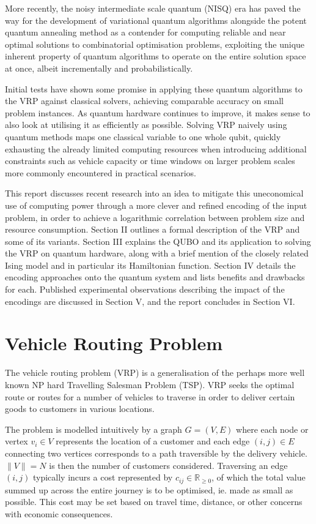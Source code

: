 \documentclass {article}
\begin{document}
More recently, the noisy intermediate scale quantum (NISQ) era has paved
the way for the development of variational quantum algorithms alongside the
potent quantum annealing method as a contender for computing reliable and
near optimal solutions to combinatorial optimisation problems, exploiting
the unique inherent property of quantum algorithms to operate on the
entire solution space at once, albeit incrementally and probabilistically.

Initial tests have shown some promise in applying these quantum algorithms
to the VRP against classical solvers, achieving comparable accuracy on
small problem instances. As quantum hardware continues to improve, it makes
sense to also look at utilising it as efficiently as possible. Solving VRP
naively using quantum methods maps one classical variable to one whole qubit,
quickly exhausting the already limited computing resources when introducing
additional constraints such as vehicle capacity or time windows on larger
problem scales more commonly encountered in practical scenarios.

This report discusses recent research into an idea to mitigate this
uneconomical use of computing power through a more clever and refined 
encoding of the input problem, in order to achieve a logarithmic correlation
between problem size and resource consumption.
Section II outlines a formal description of the VRP and some of its variants.
Section III explains the QUBO and its application to solving the VRP on
quantum hardware, along with a brief mention of the closely related
Ising model and in particular its Hamiltonian function.
Section IV details the encoding approaches onto the quantum system and lists
benefits and drawbacks for each.
Published experimental observations describing the impact of the encodings
are discussed in Section V,
and the report concludes in Section VI.

\section {Vehicle Routing Problem}
The vehicle routing problem (VRP) is a generalisation of the perhaps more
well known NP hard Travelling Salesman Problem (TSP). VRP seeks the optimal
route or routes for a number of vehicles to traverse in order to deliver
certain goods to customers in various locations.

The problem is modelled intuitively by a graph $G = (V, E)$
where each node or vertex $v_i \in V$ represents the location of a customer 
and each edge $(i, j) \in E$ connecting two vertices corresponds to a path
traversible by the delivery vehicle. $\lVert V \rVert = N$ is then the number
of customers considered. Traversing an edge $(i, j)$ typically incurs
a cost represented by $c_{ij} \in \mathbb R_{\ge 0}$, of which the total
value summed up across the entire journey is to be optimised, ie. made as
small as possible. This cost may be set based on travel time, distance,
or other concerns with economic consequences.
\end{document}

